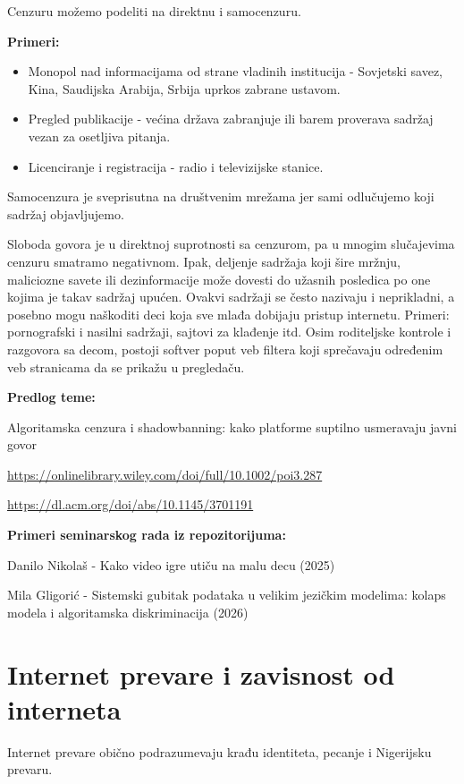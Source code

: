\documentclass{article}
\begin{document}
Cenzuru možemo podeliti na direktnu i samocenzuru.

\textbf{Primeri:}

\begin{itemize}
    \item Monopol nad informacijama od strane vladinih institucija - Sovjetski savez, Kina, Saudijska Arabija, Srbija uprkos zabrane ustavom.
    \item Pregled publikacije - većina država zabranjuje ili barem proverava sadržaj vezan za osetljiva pitanja.
    \item Licenciranje i registracija - radio i televizijske stanice.
\end{itemize}

Samocenzura je sveprisutna na društvenim mrežama jer sami odlučujemo koji sadržaj objavljujemo.

Sloboda govora je u direktnoj suprotnosti sa cenzurom, pa u mnogim slučajevima cenzuru smatramo negativnom. Ipak, deljenje sadržaja koji šire mržnju, maliciozne savete ili dezinformacije može dovesti do užasnih posledica po one kojima je takav sadržaj upućen. Ovakvi sadržaji se često nazivaju i neprikladni, a posebno mogu naškoditi deci koja sve mlađa dobijaju pristup internetu. Primeri: pornografski i nasilni sadržaji, sajtovi za klađenje itd. Osim roditeljske kontrole i razgovora sa decom, postoji softver poput veb filtera koji sprečavaju određenim veb stranicama da se prikažu u pregledaču.

\textbf{Predlog teme:}

Algoritamska cenzura i shadowbanning: kako platforme suptilno usmeravaju javni govor

\url{https://onlinelibrary.wiley.com/doi/full/10.1002/poi3.287}

\url{https://dl.acm.org/doi/abs/10.1145/3701191}

\textbf{Primeri seminarskog rada iz repozitorijuma:}

Danilo Nikolaš - Kako video igre utiču na malu decu (2025)

Mila Gligorić - Sistemski gubitak podataka u velikim jezičkim modelima: kolaps modela i algoritamska diskriminacija (2026)

\section{Internet prevare i zavisnost od interneta}

Internet prevare obično podrazumevaju krađu identiteta, pecanje i Nigerijsku prevaru. 
\end{document}
